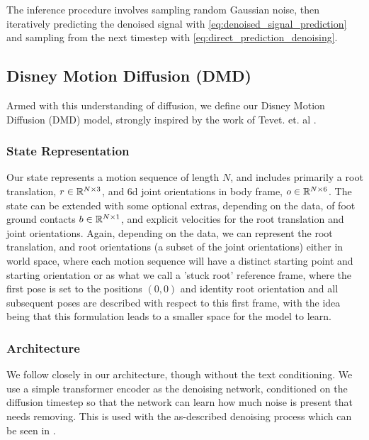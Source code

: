 The inference procedure involves sampling random Gaussian noise, then iteratively predicting the denoised signal with \eqref{eq:denoised_signal_prediction} and sampling from the next timestep with \eqref{eq:direct_prediction_denoising}.

\subsection{Disney Motion Diffusion (DMD)}
\label{sec:disney_motion_diffusion}
Armed with this understanding of diffusion, we define our Disney Motion Diffusion (DMD) model, strongly inspired by the work of Tevet. et. al \cite{MDM}.



\subsubsection{State Representation}
\label{sec:diffusion_state_representation}
Our state represents a motion sequence of length $N$, and includes primarily a root translation, $r \in \mathbb{R}^{N \times 3}$, and 6d \cite{aa_6d_angles} joint orientations in body frame, $o \in \mathbb{R}^{N \times 6}$. The state can be extended with some optional extras, depending on the data, of foot ground contacts $b \in \mathbb{R}^{N \times 1}$, and explicit velocities for the root translation and joint orientations. Again, depending on the data, we can represent the root translation, and root orientations (a subset of the joint orientations) either in world space, where each motion sequence will have a distinct starting point and starting orientation or as what we call a 'stuck root' reference frame, where the first pose is set to the positions $(0,0)$ and identity root orientation and all subsequent poses are described with respect to this first frame, with the idea being that this formulation leads to a smaller space for the model to learn.



\subsubsection{Architecture}
We follow closely \cite{MDM} in our architecture, though without the text conditioning. We use a simple transformer \cite{vaswani2017attention} encoder as the denoising network, conditioned on the diffusion timestep so that the network can learn how much noise is present that needs removing. This is used with the as-described denoising process which can be seen in .


